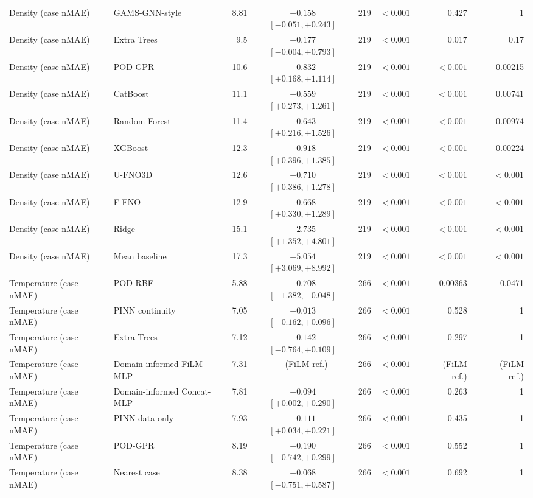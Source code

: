 \begin{landscape}
\begin{longtable}{p{4.0cm}p{3.4cm}rcrrrr}
Density (case nMAE) & GAMS-GNN-style & 8.81 & $+0.158$ $[-0.051, +0.243]$ & 219 & $< 0.001$ & 0.427 & 1 \\
Density (case nMAE) & Extra Trees & 9.5 & $+0.177$ $[-0.004, +0.793]$ & 219 & $< 0.001$ & 0.017 & 0.17 \\
Density (case nMAE) & POD-GPR & 10.6 & $+0.832$ $[+0.168, +1.114]$ & 219 & $< 0.001$ & $< 0.001$ & 0.00215 \\
Density (case nMAE) & CatBoost & 11.1 & $+0.559$ $[+0.273, +1.261]$ & 219 & $< 0.001$ & $< 0.001$ & 0.00741 \\
Density (case nMAE) & Random Forest & 11.4 & $+0.643$ $[+0.216, +1.526]$ & 219 & $< 0.001$ & $< 0.001$ & 0.00974 \\
Density (case nMAE) & XGBoost & 12.3 & $+0.918$ $[+0.396, +1.385]$ & 219 & $< 0.001$ & $< 0.001$ & 0.00224 \\
Density (case nMAE) & U-FNO3D & 12.6 & $+0.710$ $[+0.386, +1.278]$ & 219 & $< 0.001$ & $< 0.001$ & $< 0.001$ \\
Density (case nMAE) & F-FNO & 12.9 & $+0.668$ $[+0.330, +1.289]$ & 219 & $< 0.001$ & $< 0.001$ & $< 0.001$ \\
Density (case nMAE) & Ridge & 15.1 & $+2.735$ $[+1.352, +4.801]$ & 219 & $< 0.001$ & $< 0.001$ & $< 0.001$ \\
Density (case nMAE) & Mean baseline & 17.3 & $+5.054$ $[+3.069, +8.992]$ & 219 & $< 0.001$ & $< 0.001$ & $< 0.001$ \\
Temperature (case nMAE) & POD-RBF & 5.88 & $-0.708$ $[-1.382, -0.048]$ & 266 & $< 0.001$ & 0.00363 & 0.0471 \\
Temperature (case nMAE) & PINN continuity & 7.05 & $-0.013$ $[-0.162, +0.096]$ & 266 & $< 0.001$ & 0.528 & 1 \\
Temperature (case nMAE) & Extra Trees & 7.12 & $-0.142$ $[-0.764, +0.109]$ & 266 & $< 0.001$ & 0.297 & 1 \\
Temperature (case nMAE) & Domain-informed FiLM-MLP & 7.31 & -- (FiLM ref.) & 266 & $< 0.001$ & -- (FiLM ref.) & -- (FiLM ref.) \\
Temperature (case nMAE) & Domain-informed Concat-MLP & 7.81 & $+0.094$ $[+0.002, +0.290]$ & 266 & $< 0.001$ & 0.263 & 1 \\
Temperature (case nMAE) & PINN data-only & 7.93 & $+0.111$ $[+0.034, +0.221]$ & 266 & $< 0.001$ & 0.435 & 1 \\
Temperature (case nMAE) & POD-GPR & 8.19 & $-0.190$ $[-0.742, +0.299]$ & 266 & $< 0.001$ & 0.552 & 1 \\
Temperature (case nMAE) & Nearest case & 8.38 & $-0.068$ $[-0.751, +0.587]$ & 266 & $< 0.001$ & 0.692 & 1 \\

\end{longtable}
\end{landscape}
